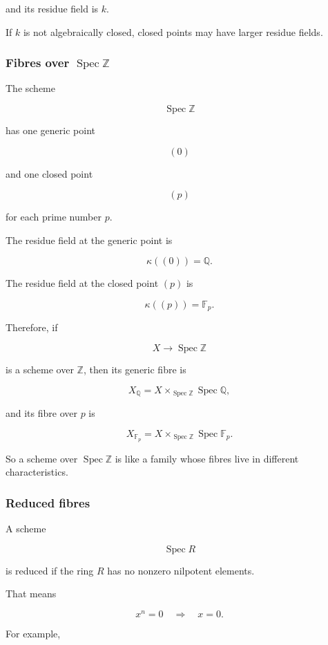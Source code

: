 \documentclass[12pt,a4paper]{article}
\theoremstyle{notespace}
\begin{document}
and its residue field is \(k\).

If \(k\) is not algebraically closed, closed points may have larger residue fields.

\subsubsection{Fibres over \texorpdfstring{\(\operatorname{Spec}\mathbb{Z}\)}{Spec Z}}

The scheme

\[
\operatorname{Spec}\mathbb{Z}
\]

has one generic point

\[
(0)
\]

and one closed point

\[
(p)
\]

for each prime number \(p\).

The residue field at the generic point is

\[
\kappa((0))=\mathbb{Q}.
\]

The residue field at the closed point \((p)\) is

\[
\kappa((p))=\mathbb{F}_p.
\]

Therefore, if

\[
X\to \operatorname{Spec}\mathbb{Z}
\]

is a scheme over \(\mathbb{Z}\), then its generic fibre is

\[
X_{\mathbb{Q}}
=
X\times_{\operatorname{Spec}\mathbb{Z}}\operatorname{Spec}\mathbb{Q},
\]

and its fibre over \(p\) is

\[
X_{\mathbb{F}_p}
=
X\times_{\operatorname{Spec}\mathbb{Z}}\operatorname{Spec}\mathbb{F}_p.
\]

So a scheme over \(\operatorname{Spec}\mathbb{Z}\) is like a family whose fibres live in different characteristics.

\subsubsection{Reduced fibres}

A scheme

\[
\operatorname{Spec}R
\]

is reduced if the ring \(R\) has no nonzero nilpotent elements.

That means

\[
x^n=0
\quad\Longrightarrow\quad
x=0.
\]

For example,
\end{document}
